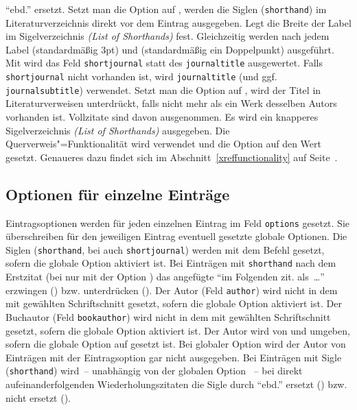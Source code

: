 \documentclass[ngerman]{scrartcl}
\begin{document}
	  \enquote{ebd.} ersetzt.
	  Setzt man die Option auf , werden die Siglen (\texttt{shorthand})
		im Literaturverzeichnis direkt vor dem Eintrag ausgegeben.
	  Legt die Breite der Label im Sigelverzeichnis \emph{(List of Shorthands)} 
	  fest. Gleichzeitig werden nach jedem Label 
	  (standardmäßig 3pt) und  (standardmäßig ein
	  Doppelpunkt) ausgeführt.
    Mit  wird das Feld \texttt{shortjournal} statt des 
    \texttt{journaltitle} ausgewertet. Falls \texttt{shortjournal} nicht 
    vorhanden ist, wird \texttt{journaltitle} (und ggf. \texttt{journalsubtitle})
    verwendet.
    Setzt man die Option auf , wird der Titel in Literaturverweisen
		unterdrückt, falls nicht mehr als ein Werk desselben Autors vorhanden ist.
		Vollzitate sind davon ausgenommen.
	  Es wird ein knapperes Sigelverzeichnis \emph{(List of Shorthands)} 
	  ausgegeben.
	  Die Querverweis"=Funktionalität wird verwendet und die Option 
		auf den Wert  gesetzt. Genaueres dazu findet sich 
	  im Abschnitt~\ref{xreffunctionality} auf Seite~\pageref{xreffunctionality}.

\subsection{Optionen für einzelne Einträge}
Eintragsoptionen werden für jeden einzelnen Eintrag im Feld \texttt{options} gesetzt. 
Sie überschreiben für den jeweiligen Eintrag eventuell gesetzte globale Optionen.
	  Die Siglen (\texttt{shorthand}, bei  auch 
	  \texttt{shortjournal}) werden mit dem Befehl  gesetzt,
	  sofern die globale Option  aktiviert ist.
	  Bei Einträgen mit \texttt{shorthand} nach dem Erstzitat (bei 
	   nur mit der Option ) das
	  angefügte \enquote{im Folgenden zit. als~\ldots} erzwingen ()
	  bzw. unterdrücken ().
	  Der Autor (Feld \texttt{author}) wird nicht in dem mit  gewählten Schriftschnitt 
	  gesetzt, sofern die globale Option  aktiviert ist.
	  Der Buchautor (Feld \texttt{bookauthor}) wird nicht in dem mit  gewählten Schriftschnitt 
	  gesetzt, sofern die globale Option  aktiviert ist.
	  Der Autor wird von  und  umgeben, 
		sofern die globale Option  auf  gesetzt ist.
		Bei globaler Option  wird der Autor von Einträgen
		mit der Eintragsoption  gar nicht ausgegeben.
	  Bei Einträgen mit Sigle (\texttt{shorthand}) wird~-- unabhängig von der 
	  globalen Option ~-- bei direkt aufeinanderfolgenden 
	  Wiederholungszitaten die Sigle durch \enquote{ebd.} ersetzt ()
	  bzw. nicht ersetzt ().
\end{document}
